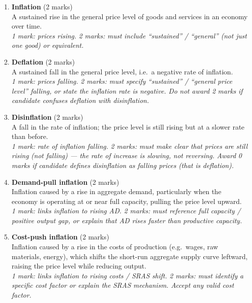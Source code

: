 \documentclass[12pt,a4paper]{article}
\begin{document}
\begin{enumerate}[leftmargin=*, label=\textbf{\arabic*.}]

    \item \textbf{Inflation} \hfill (2 marks)\\
    A sustained rise in the general price level of goods and services in an economy over time.\\
    \textit{1 mark: prices rising. 2 marks: must include ``sustained'' / ``general'' (not just one good) or equivalent.}

    \vspace{0.5em}

    \item \textbf{Deflation} \hfill (2 marks)\\
    A sustained fall in the general price level, i.e.\ a negative rate of inflation.\\
    \textit{1 mark: prices falling. 2 marks: must specify ``sustained'' / ``general price level'' falling, or state the inflation rate is negative. Do not award 2 marks if candidate confuses deflation with disinflation.}

    \vspace{0.5em}

    \item \textbf{Disinflation} \hfill (2 marks)\\
    A fall in the rate of inflation; the price level is still rising but at a slower rate than before.\\
    \textit{1 mark: rate of inflation falling. 2 marks: must make clear that prices are still rising (not falling) --- the rate of increase is slowing, not reversing. Award 0 marks if candidate defines disinflation as falling prices (that is deflation).}

    \vspace{0.5em}

    \item \textbf{Demand-pull inflation} \hfill (2 marks)\\
    Inflation caused by a rise in aggregate demand, particularly when the economy is operating at or near full capacity, pulling the price level upward.\\
    \textit{1 mark: links inflation to rising AD. 2 marks: must reference full capacity / positive output gap, or explain that AD rises faster than productive capacity.}

    \vspace{0.5em}

    \item \textbf{Cost-push inflation} \hfill (2 marks)\\
    Inflation caused by a rise in the costs of production (e.g.\ wages, raw materials, energy), which shifts the short-run aggregate supply curve leftward, raising the price level while reducing output.\\
    \textit{1 mark: links inflation to rising costs / SRAS shift. 2 marks: must identify a specific cost factor or explain the SRAS mechanism. Accept any valid cost factor.}

\end{enumerate}
\end{document}
